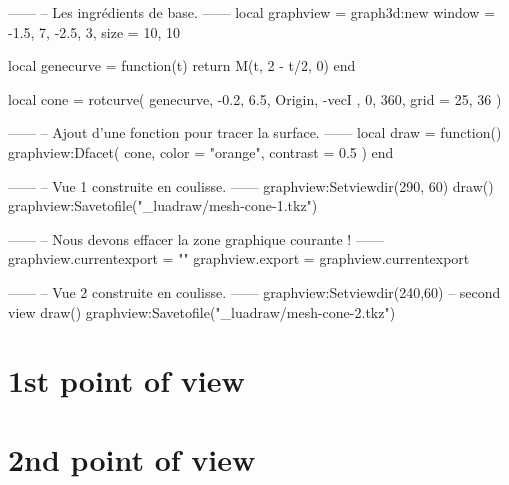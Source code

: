 \documentclass[varwidth]{standalone}
\begin{document}
\begin{luadraw}{}
------
-- Les ingrédients de base.
------
local graphview = graph3d:new{
  window = {-1.5, 7, -2.5, 3},
  size   = {10, 10}
}

local genecurve = function(t)
  return M(t, 2 - t/2, 0)
end

local cone = rotcurve(
  genecurve, -0.2, 6.5,
  {
    Origin, -vecI
  },
  0, 360,
  {
    grid = {25, 36}
  }
)

------
-- Ajout d'une fonction pour tracer la surface.
------
local draw = function()
  graphview:Dfacet(
    cone,
    {
      color  = "orange",
      contrast = 0.5
    }
  )
end

------
-- Vue 1 construite en coulisse.
------
graphview:Setviewdir(290, 60)
draw()
graphview:Savetofile("_luadraw/mesh-cone-1.tkz")

------
-- Nous devons effacer la zone graphique courante !
------
graphview.currentexport = {""}
graphview.export        = graphview.currentexport

------
-- Vue 2 construite en coulisse.
------
graphview:Setviewdir(240,60) -- second view
draw()
graphview:Savetofile("_luadraw/mesh-cone-2.tkz")
\end{luadraw}

\section*{1st point of view}




\section*{2nd point of view}


\end{document}
